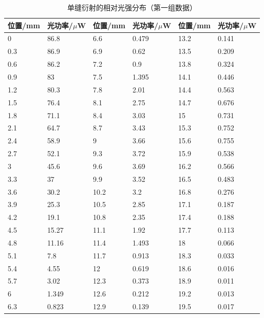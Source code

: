 \documentclass[dvipsnames, svgnames,a4paper,11pt]{article}
\begin{document}
\begin{table}[H]
    \centering
	\caption{单缝衍射的相对光强分布（第一组数据）}
    \begin{tabular}{|l|l|l|l|l|l|}
    \hline
		位置/mm&光功率/$\mu$W&位置/mm&光功率/$\mu$W&位置/mm&光功率/$\mu$W\\ \hline
        0 & 86.8 & 6.6 & 0.479 & 13.2 & 0.141 \\ \hline
        0.3 & 86.9 & 6.9 & 0.62 & 13.5 & 0.209 \\ \hline
        0.6 & 86.2 & 7.2 & 0.9 & 13.8 & 0.324 \\ \hline
        0.9 & 83 & 7.5 & 1.395 & 14.1 & 0.446 \\ \hline
        1.2 & 80.3 & 7.8 & 2.01 & 14.4 & 0.563 \\ \hline
        1.5 & 76.4 & 8.1 & 2.75 & 14.7 & 0.676 \\ \hline
        1.8 & 71.1 & 8.4 & 3.03 & 15 & 0.731 \\ \hline
        2.1 & 64.7 & 8.7 & 3.43 & 15.3 & 0.752 \\ \hline
        2.4 & 58.9 & 9 & 3.66 & 15.6 & 0.755 \\ \hline
        2.7 & 52.1 & 9.3 & 3.72 & 15.9 & 0.538 \\ \hline
        3 & 45.6 & 9.6 & 3.69 & 16.2 & 0.566 \\ \hline
        3.3 & 37 & 9.9 & 3.52 & 16.5 & 0.483 \\ \hline
        3.6 & 30.2 & 10.2 & 3.2 & 16.8 & 0.276 \\ \hline
        3.9 & 25.3 & 10.5 & 2.85 & 17.1 & 0.187 \\ \hline
        4.2 & 19.1 & 10.8 & 2.35 & 17.4 & 0.188 \\ \hline
        4.5 & 15.27 & 11.1 & 1.92 & 17.7 & 0.113 \\ \hline
        4.8 & 11.16 & 11.4 & 1.493 & 18 & 0.066 \\ \hline
        5.1 & 7.8 & 11.7 & 0.913 & 18.3 & 0.033 \\ \hline
        5.4 & 4.55 & 12 & 0.619 & 18.6 & 0.016 \\ \hline
        5.7 & 3.02 & 12.3 & 0.373 & 18.9 & 0.011 \\ \hline
        6 & 1.349 & 12.6 & 0.212 & 19.2 & 0.013 \\ \hline
        6.3 & 0.823 & 12.9 & 0.139 & 19.5 & 0.017 \\ \hline
    \end{tabular}
\end{table}
\end{document}
